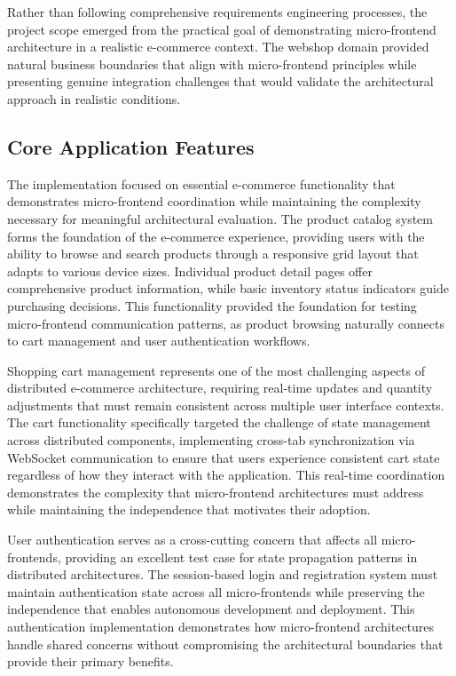 \documentclass[12pt,a4paper]{report}
\begin{document}
Rather than following comprehensive requirements engineering processes, the project scope emerged from the practical goal of demonstrating micro-frontend architecture in a realistic e-commerce context. The webshop domain provided natural business boundaries that align with micro-frontend principles while presenting genuine integration challenges that would validate the architectural approach in realistic conditions.

\subsection{Core Application Features}

The implementation focused on essential e-commerce functionality that demonstrates micro-frontend coordination while maintaining the complexity necessary for meaningful architectural evaluation. The product catalog system forms the foundation of the e-commerce experience, providing users with the ability to browse and search products through a responsive grid layout that adapts to various device sizes. Individual product detail pages offer comprehensive product information, while basic inventory status indicators guide purchasing decisions. This functionality provided the foundation for testing micro-frontend communication patterns, as product browsing naturally connects to cart management and user authentication workflows.

Shopping cart management represents one of the most challenging aspects of distributed e-commerce architecture, requiring real-time updates and quantity adjustments that must remain consistent across multiple user interface contexts. The cart functionality specifically targeted the challenge of state management across distributed components, implementing cross-tab synchronization via WebSocket communication to ensure that users experience consistent cart state regardless of how they interact with the application. This real-time coordination demonstrates the complexity that micro-frontend architectures must address while maintaining the independence that motivates their adoption.

User authentication serves as a cross-cutting concern that affects all micro-frontends, providing an excellent test case for state propagation patterns in distributed architectures. The session-based login and registration system must maintain authentication state across all micro-frontends while preserving the independence that enables autonomous development and deployment. This authentication implementation demonstrates how micro-frontend architectures handle shared concerns without compromising the architectural boundaries that provide their primary benefits.
\end{document}

